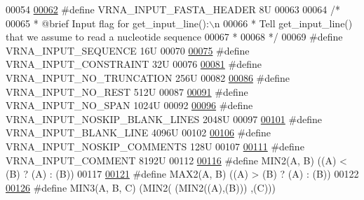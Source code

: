 \begin{DoxyCode}
00054 
\hyperlink{group__utils_ga2f0d8069e93d3ac54d9320d6bdb8e7e7}{00062} \textcolor{preprocessor}{#define VRNA\_INPUT\_FASTA\_HEADER           8U}
00063 
00064 \textcolor{comment}{/*}
00065 \textcolor{comment}{ *  @brief  Input flag for get\_input\_line():\(\backslash\)n}
00066 \textcolor{comment}{ *  Tell get\_input\_line() that we assume to read a nucleotide sequence}
00067 \textcolor{comment}{ * }
00068 \textcolor{comment}{ */}
00069 \textcolor{preprocessor}{#define VRNA\_INPUT\_SEQUENCE               16U}
00070 
\hyperlink{group__utils_gac08a9df45b9721b97a47dbfe7a6e5f85}{00075} \textcolor{preprocessor}{#define VRNA\_INPUT\_CONSTRAINT             32U}
00076 
\hyperlink{group__utils_ga086742158293217a46ae2f71bb296937}{00081} \textcolor{preprocessor}{#define VRNA\_INPUT\_NO\_TRUNCATION          256U}
00082 
\hyperlink{group__utils_ga7a2e8c50a0c7ce82e60da1016e1367fd}{00086} \textcolor{preprocessor}{#define VRNA\_INPUT\_NO\_REST                512U}
00087 
\hyperlink{group__utils_ga0de536599b881c787b0943a2671da476}{00091} \textcolor{preprocessor}{#define VRNA\_INPUT\_NO\_SPAN                1024U}
00092 
\hyperlink{group__utils_gab4db885222b3b69608310d7c7e63e286}{00096} \textcolor{preprocessor}{#define VRNA\_INPUT\_NOSKIP\_BLANK\_LINES     2048U}
00097 
\hyperlink{group__utils_ga305474b93ccb79ae4c7754016a8ddd84}{00101} \textcolor{preprocessor}{#define VRNA\_INPUT\_BLANK\_LINE             4096U}
00102 
\hyperlink{group__utils_ga0f6311f11bed1842e3a527ab27b294c6}{00106} \textcolor{preprocessor}{#define VRNA\_INPUT\_NOSKIP\_COMMENTS        128U}
00107 
\hyperlink{group__utils_gaf2062e0eeefffd3ed639af460b3d4fab}{00111} \textcolor{preprocessor}{#define VRNA\_INPUT\_COMMENT                8192U}
00112 
\hyperlink{group__utils_gae0b9cd0ce090bd69b951aa73e8fa4f7d}{00116} \textcolor{preprocessor}{#define MIN2(A, B)      ((A) < (B) ? (A) : (B))}
00117 
\hyperlink{group__utils_ga33297b3679c713b0c4d897cd0fe3b122}{00121} \textcolor{preprocessor}{#define MAX2(A, B)      ((A) > (B) ? (A) : (B))}
00122 
\hyperlink{group__utils_ga721b8d5f3abef17f10293f1f7f8c958e}{00126} \textcolor{preprocessor}{#define MIN3(A, B, C)   (MIN2(  (MIN2((A),(B))) ,(C)))}

\end{DoxyCode}
